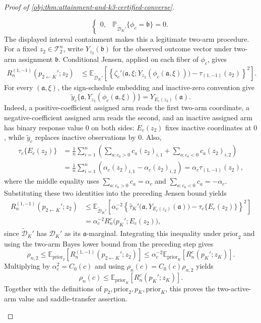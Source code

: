 \documentclass[11pt]{article}
\begin{document}
\begin{proof}[Proof of \cref{obj:thm:attainment-and-k3-certified-converse}]
\begin{enumerate}
\[\begin{cases}
0,&\mathbb P_{\widetilde{\mathcal D}_K'}\{\phi_c=\mathfrak b\}=0.
\end{cases}
\]
The displayed interval containment makes this a legitimate two-arm procedure. For a fixed \(z_2\in\mathcal T_2^n\), write \(Y_{z_2}(\mathfrak b)\) for the observed outcome vector under two-arm assignment \(\mathfrak b\). Conditional Jensen, applied on each fiber of \(\phi_c\), gives
\[
\begin{aligned}
R_n^{(1,-1)}(p_{2\leftarrow K}';z_2)
&\le
\mathbb E_{\widetilde{\mathcal D}_K'}\!\left[
\left\{
\zeta_c'\bigl(\mathfrak a,\xi;Y_{z_2}(\phi_c(\mathfrak a,\xi))\bigr)
-\tau_{(1,-1)}(z_2)
\right\}^2
\right].
\end{aligned}
\]
For every \((\mathfrak a,\xi)\), the sign-schedule embedding and inactive-zero convention give
\[
\widetilde y_c\{\mathfrak a,Y_{z_2}(\phi_c(\mathfrak a,\xi))\}
=
Y_{E_c(z_2)}(\mathfrak a).
\]
Indeed, a positive-coefficient assigned arm reads the first two-arm coordinate, a negative-coefficient assigned arm reads the second, and an inactive assigned arm has binary response value \(0\) on both sides: \(E_c(z_2)\) fixes inactive coordinates at \(0\), while \(\widetilde y_c\) replaces inactive observations by \(0\). Also,
\[
\begin{aligned}
\tau_c\{E_c(z_2)\}
&=\frac1n\sum_{i=1}^n
\left(
\sum_{a:c_a>0}c_a(z_2)_{i,1}
+
\sum_{a:c_a<0}c_a(z_2)_{i,2}
\right)\\
&=\frac1n\sum_{i=1}^n
\left(\alpha_c(z_2)_{i,1}-\alpha_c(z_2)_{i,2}\right)
=\alpha_c\tau_{(1,-1)}(z_2),
\end{aligned}
\]
where the middle equality uses \(\sum_{a:c_a>0}c_a=\alpha_c\) and \(\sum_{a:c_a<0}c_a=-\alpha_c\). Substituting these two identities into the preceding Jensen bound yields
\[
\begin{aligned}
R_n^{(1,-1)}(p_{2\leftarrow K}';z_2)
&\le
\mathbb E_{\widetilde{\mathcal D}_K'}\!\left[
\alpha_c^{-2}
\left\{
\widehat\tau_K'\bigl(\mathfrak a,Y_{E_c(z_2)}(\mathfrak a)\bigr)
-\tau_c\{E_c(z_2)\}
\right\}^2
\right]\\
&=
\alpha_c^{-2}R_n^c\bigl(p_K';E_c(z_2)\bigr),
\end{aligned}
\]
since \(\widetilde{\mathcal D}_K'\) has \(\mathcal D_K'\) as its \(\mathfrak a\)-marginal.
Integrating this inequality under \(\mathrm{prior}_2\) and using the two-arm Bayes lower bound from the preceding step gives
\[
\rho_{n,2}
\le
\mathbb E_{\mathrm{prior}_2}\!\left[
R_n^{(1,-1)}(p_{2\leftarrow K}';z_2)
\right]
\le
\alpha_c^{-2}
\mathbb E_{\mathrm{prior}_K}\!\left[
R_n^c(p_K';z_K)
\right].
\]
Multiplying by \(\alpha_c^2=C_0(c)\) and using \(\rho_n(c)=C_0(c)\rho_{n,2}\) yields
\[
\rho_n(c)
\le
\mathbb E_{\mathrm{prior}_K}\!\left[
R_n^c(p_K';z_K)
\right].
\]
Together with the definitions of \(p_2,\mathrm{prior}_2,p_K,\mathrm{prior}_K\), this proves the two-active-arm value and saddle-transfer assertion.


\end{enumerate}
\end{proof}
\end{document}
